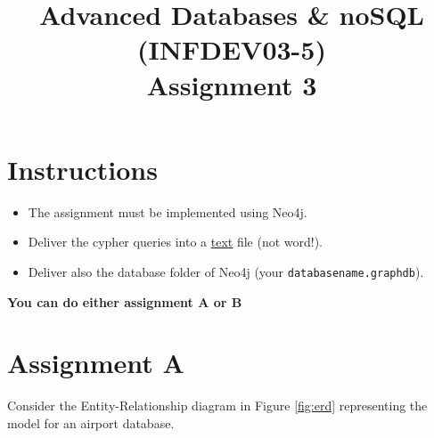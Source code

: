 \documentclass[10pt,a4paper]{article}
\title{Advanced Databases \& noSQL (INFDEV03-5) \\ Assignment 3}
\author { }
\date { }
\begin{document}
\maketitle

\section*{Instructions}
\begin{itemize}[noitemsep]
\item The assignment must be implemented using Neo4j.
\item Deliver the cypher queries into a \underline{text} file (not word!).
\item Deliver also the database folder of Neo4j (your \texttt{database\textunderscore name.graphdb}).
\end{itemize}

\textbf{You can do either assignment A or B}

\section*{Assignment A}
Consider the Entity-Relationship diagram in Figure \ref{fig:erd} representing the model for an airport database.
\end{document}
